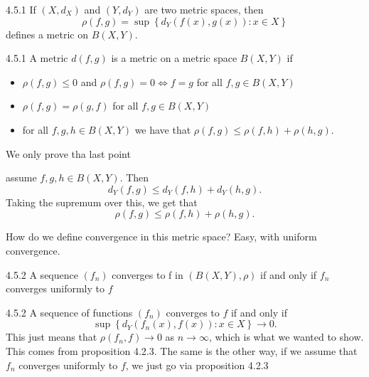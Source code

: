 \documentclass[a4paper,norsk]{article}
\renewcommand{\leq}{\leqslant}
\begin{document}
\begin{propositionbox}{4.5.1}{}
If $ \left( X, d_X \right)  $ and $ \left( Y, d_Y \right)  $ are two metric spaces, then 
\[
    \rho \left( f, g \right) = \sup \left\{ d_Y \left( f(x), g(x) \right) : x \in X \right\} 
\]
defines a metric on $ B \left( X, Y \right)  $. 

\begin{proofbox}{4.5.1}{}
  A metric $ d (f, g) $ is a metric on a metric space $ B \left( X, Y \right)  $  if
  \begin{itemize}
    \item $ \rho \left( f, g \right) \leq 0 $ and $ \rho(f,g) = 0 \iff f = g $ for all $ f, g \in B \left( X, Y \right)  $  
    \item $ \rho \left( f, g \right) = \rho \left( g, f \right)   $ for all $ f, g \in B \left( X, Y \right)  $ 
    \item for all $ f, g, h \in B \left( X, Y \right)  $ we have that $ \rho \left( f, g \right) \leq \rho \left( f, h \right) + \rho \left( h, g \right)  $.
  \end{itemize}

  We only prove tha last point

  assume $ f, g, h \in B \left( X, Y \right)  $. Then 
  \[
      d_Y \left( f, g \right) \leq d_Y \left( f, h \right) + d_Y \left( h, g \right).
  \]
  Taking the supremum over this, we get that 
  \[
      \rho \left( f, g \right) \leq \rho \left( f, h \right) + \rho \left( h, g \right).
  \]
\end{proofbox}
\end{propositionbox}


How do we define convergence in this metric space? Easy, with uniform convergence. 

\begin{propositionbox}{4.5.2}{}
A sequence $ \left( f_n \right)  $ converges to f in $ \left( B \left( X, Y \right), \rho \right)   $ if and only if $ f_n $ converges uniformly to $ f $ 

\begin{proofbox}{4.5.2}{}
  A sequence of functions $ \left( f_n \right)  $ converges to $ f $ if and only if 
  \[
      \sup \left\{ d_Y \left( f_n(x), f(x) \right) : x \in X \right\} \to 0.
  \]
  This just means that $ \rho \left( f_n, f \right) \to 0 $ as $ n \to \infty $, which is what we wanted to show. This comes from proposition 4.2.3. The same is the other way, if we assume that $ f_n $  converges uniformly to $f $, we just go via proposition 4.2.3
  
\end{proofbox}
\end{propositionbox}
\end{document}
